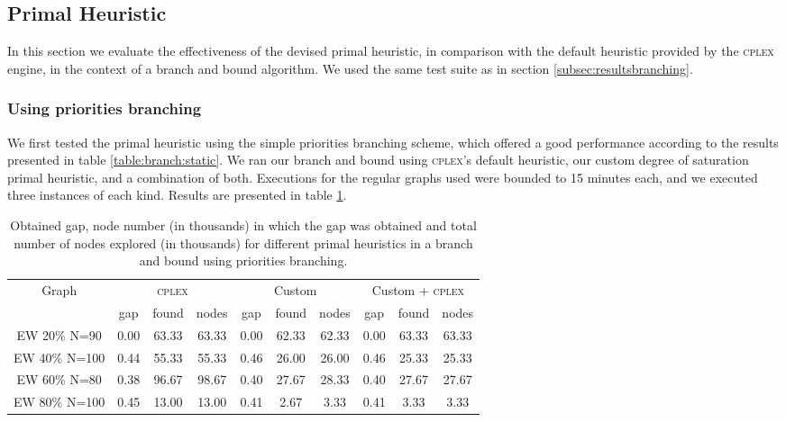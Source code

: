 
\subsection{Primal Heuristic}
\label{subsec:resultsprimal}

In this section we evaluate the effectiveness of the devised primal heuristic, in comparison with the default heuristic provided by the \textsc{cplex} engine, in the context of a branch and bound algorithm. We used the same test suite as in section \ref{subsec:resultsbranching}.

\subsubsection{Using priorities branching}

We first tested the primal heuristic using the simple priorities branching scheme, which offered a good performance according to the results presented in table \ref{table:branch:static}. We ran our branch and bound using \textsc{cplex}'s default heuristic, our custom degree of saturation primal heuristic, and a combination of both. Executions for the regular graphs used were bounded to 15 minutes each, and we executed three instances of each kind. Results are presented in table \ref{table:primal:prios}.

\begin{table}[h]
\label{table:primal:prios}
\centering

\begin{tabular}{|c|ccc|ccc|ccc|}
\hline
\multicolumn{1}{|c|}{Graph} & \multicolumn{3}{|c|}{\textsc{cplex}} & \multicolumn{3}{|c|}{Custom} & \multicolumn{3}{|c|}{Custom + \textsc{cplex}}
\\
 & gap & found & nodes & gap & found & nodes & gap & found & nodes
\\
\hline
EW 20\% N=90 & 0.00 & 63.33 & 63.33 & 0.00 & 62.33 & 62.33 & 0.00 & 63.33 & 63.33
\\
EW 40\% N=100 & 0.44 & 55.33 & 55.33 & 0.46 & 26.00 & 26.00 & 0.46 & 25.33 & 25.33
\\
EW 60\% N=80 & 0.38 & 96.67 & 98.67 & 0.40 & 27.67 & 28.33 & 0.40 & 27.67 & 27.67
\\
EW 80\% N=100 & 0.45 & 13.00 & 13.00 & 0.41 & 2.67 & 3.33 & 0.41 & 3.33 & 3.33
\\
\hline 
 \end{tabular}
 
\caption{Obtained gap, node number (in thousands) in which the gap was obtained and total number of nodes explored (in thousands) for different primal heuristics in a branch and bound using priorities branching.}

\end{table}

